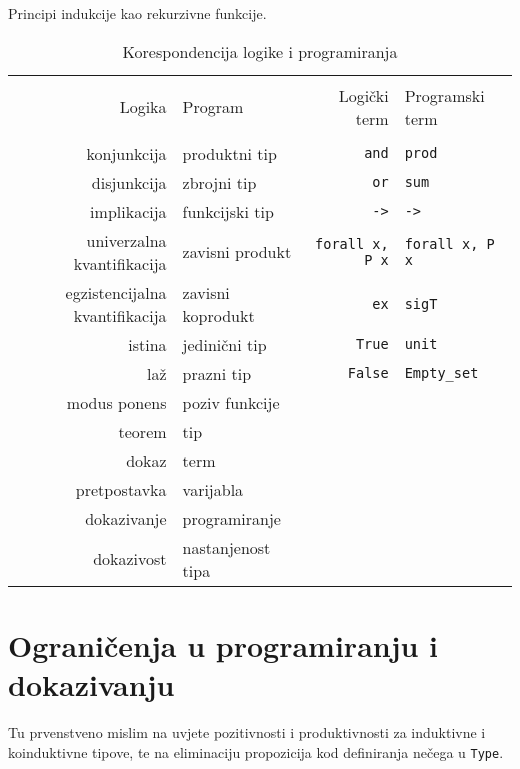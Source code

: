 Principi indukcije kao rekurzivne funkcije.
\begin{table}[hbt]
  \centering
  \begin{tabular}[hbt]{rlrl}
    \toprule \\
    Logika & Program & Logički term & Programski term \\
    \midrule \\
    konjunkcija & produktni tip  & \texttt{and} & \texttt{prod} \\
    disjunkcija & zbrojni tip & \texttt{or} & \texttt{sum} \\
    implikacija & funkcijski tip & \texttt{->} & \texttt{->} \\
    univerzalna kvantifikacija & zavisni produkt & \texttt{forall x, P x} & \texttt{forall x, P x} \\
    egzistencijalna kvantifikacija & zavisni koprodukt & \texttt{ex} & \texttt{sigT} \\
    istina & jedinični tip & \texttt{True} & \texttt{unit} \\
    laž & prazni tip & \texttt{False} & \texttt{Empty\_set} \\
    modus ponens & poziv funkcije &  &  \\
    teorem & tip & & \\
    dokaz & term & & \\
    pretpostavka & varijabla & & \\
    dokazivanje & programiranje & & \\
    dokazivost & nastanjenost tipa & & \\
    \bottomrule
  \end{tabular}
  \caption{Korespondencija logike i programiranja}\label{tab:curryhoward}
\end{table}



\section{Ograničenja u programiranju i dokazivanju}\label{sec:ogranicenja}
Tu prvenstveno mislim na uvjete pozitivnosti i produktivnosti za induktivne i koinduktivne tipove,
te na eliminaciju propozicija kod definiranja nečega u \texttt{Type}.

